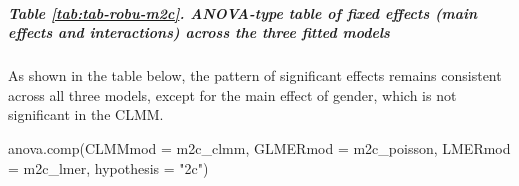 \documentclass[
  bookmarksnumbered]{article}
\newenvironment{Shaded}{\begin{snugshade}}{\end{snugshade}}
\newcommand{\AttributeTok}[1]{\textcolor[rgb]{0.80,0.80,0.80}{#1}}
\newcommand{\FunctionTok}[1]{\textcolor[rgb]{0.94,0.94,0.56}{#1}}
\newcommand{\NormalTok}[1]{\textcolor[rgb]{0.80,0.80,0.80}{#1}}
\newcommand{\StringTok}[1]{\textcolor[rgb]{0.80,0.58,0.58}{#1}}
\begin{document}
\subparagraph{Table \ref{tab:tab-robu-m2c}. ANOVA-type table of fixed effects (main effects and interactions) across the three fitted models}\label{table-reftabtab-robu-m2c.-anova-type-table-of-fixed-effects-main-effects-and-interactions-across-the-three-fitted-models}

As shown in the table below, the pattern of significant effects remains consistent across all three models, except for the main effect of gender, which is not significant in the CLMM.

\begin{Shaded}
\begin{Highlighting}[]
\FunctionTok{anova.comp}\NormalTok{(}\AttributeTok{CLMMmod =}\NormalTok{ m2c\_clmm, }\AttributeTok{GLMERmod =}\NormalTok{ m2c\_poisson, }\AttributeTok{LMERmod =}\NormalTok{ m2c\_lmer, }\AttributeTok{hypothesis =} \StringTok{"2c"}\NormalTok{)}
\end{Highlighting}
\end{Shaded}
\end{document}
